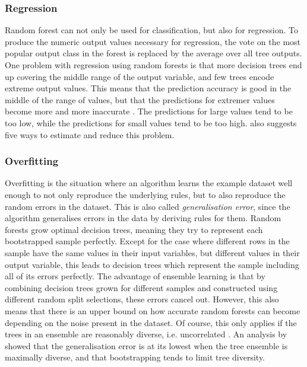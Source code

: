 \documentclass[a4paper,man,12pt,apacite,floatsintext,draftfirst]{apa6} %
\begin{document}
\subsubsection{Regression}
Random forest can not only be used for classification, but also for regression.
To produce the numeric output values necessary for regression,
the vote on the most popular output class in the forest is replaced by the
average over all tree outputs.
One problem with regression using random forests is that more decision trees
end up covering the middle range of the output variable,
and few trees encode extreme output values.
This means that the prediction accuracy is good in the middle of the range
of values, but that the predictions for extremer values become more and more
inaccurate \cite{zhang2012bias}.
The predictions for large values tend to be too low, while the predictions for
small values tend to be too high.
 also suggests five ways to estimate and reduce this problem.

\subsubsection{Overfitting}
Overfitting \cite{wpOF} is the situation where an algorithm learns the
example dataset well enough to not only reproduce the underlying rules,
but to also reproduce the random errors in the dataset.
This is also called \emph{generalisation error}, since the algorithm
generalises errors in the data by deriving rules for them.
Random forests grow optimal decision trees, meaning they try to represent
each bootstrapped sample perfectly.
Except for the case where different rows in the sample have the same
values in their input variables, but different values in their output variable,
this leads to decision trees which represent the sample including all of its errors perfectly.
The advantage of ensemble learning is that by combining decision trees grown
for different samples and constructed using different random split selections,
these errors cancel out.
However, this also means that there is an upper bound on how accurate
random forests can become depending on the noise present in the dataset.
Of course, this only applies if the trees in an ensemble are reasonably
diverse, i.e. uncorrelated \cite{breiman2001random}.
An analysis by  showed that the generalisation error
is at its lowest when the tree ensemble is maximally diverse,
and that bootstrapping tends to limit tree diversity.
\end{document}

